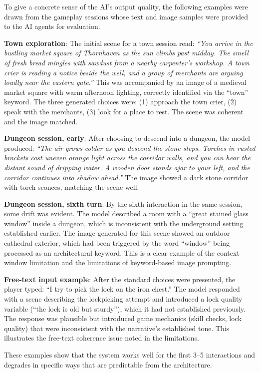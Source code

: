\documentclass[12pt,a4paper]{article}
\begin{document}
To give a concrete sense of the AI's output quality, the following examples were drawn from the gameplay sessions whose text and image samples were provided to the AI agents for evaluation.

\textbf{Town exploration}: The initial scene for a town session read: \textit{``You arrive in the bustling market square of Thornhaven as the sun climbs past midday. The smell of fresh bread mingles with sawdust from a nearby carpenter's workshop. A town crier is reading a notice beside the well, and a group of merchants are arguing loudly near the eastern gate.''} This was accompanied by an image of a medieval market square with warm afternoon lighting, correctly identified via the ``town'' keyword. The three generated choices were: (1) approach the town crier, (2) speak with the merchants, (3) look for a place to rest. The scene was coherent and the image matched.

\textbf{Dungeon session, early}: After choosing to descend into a dungeon, the model produced: \textit{``The air grows colder as you descend the stone steps. Torches in rusted brackets cast uneven orange light across the corridor walls, and you can hear the distant sound of dripping water. A wooden door stands ajar to your left, and the corridor continues into shadow ahead.''} The image showed a dark stone corridor with torch sconces, matching the scene well.

\textbf{Dungeon session, sixth turn}: By the sixth interaction in the same session, some drift was evident. The model described a room with a ``great stained glass window'' inside a dungeon, which is inconsistent with the underground setting established earlier. The image generated for this scene showed an outdoor cathedral exterior, which had been triggered by the word ``window'' being processed as an architectural keyword. This is a clear example of the context window limitation and the limitations of keyword-based image prompting.

\textbf{Free-text input example}: After the standard choices were presented, the player typed: ``I try to pick the lock on the iron chest.'' The model responded with a scene describing the lockpicking attempt and introduced a lock quality variable (``the lock is old but sturdy''), which it had not established previously. The response was plausible but introduced game mechanics (skill checks, lock quality) that were inconsistent with the narrative's established tone. This illustrates the free-text coherence issue noted in the limitations.

These examples show that the system works well for the first 3--5 interactions and degrades in specific ways that are predictable from the architecture.
\end{document}
